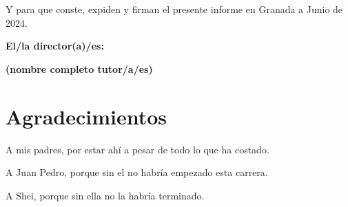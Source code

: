 \vspace{0.5cm}

Y para que conste, expiden y firman el presente informe en Granada a Junio de 2024.

\vspace{1cm}

\textbf{El/la director(a)/es: }

\vspace{5cm}

\noindent \textbf{(nombre completo tutor/a/es)}

\chapter*{Agradecimientos}

A mis padres, por estar ahí a pesar de todo lo que ha costado.

A Juan Pedro, porque sin el no habría empezado esta carrera.

A Shei, porque sin ella no la habría terminado.




